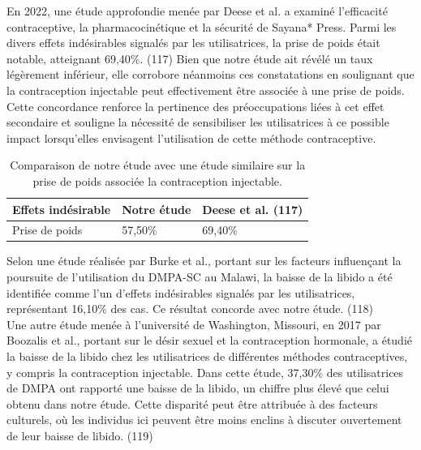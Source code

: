 \noindent En 2022, une étude approfondie menée par Deese et al. a examiné l'efficacité contraceptive, la pharmacocinétique et la sécurité de Sayana* Press. Parmi les divers effets indésirables signalés par les utilisatrices, la prise de poids était notable, atteignant 69,40\%. (117) Bien que notre étude ait révélé un taux légèrement inférieur, elle corrobore néanmoins ces constatations en soulignant que la contraception injectable peut effectivement être associée à une prise de poids. Cette concordance renforce la pertinence des préoccupations liées à cet effet secondaire et souligne la nécessité de sensibiliser les utilisatrices à ce possible impact lorsqu'elles envisagent l'utilisation de cette méthode contraceptive.

\begin{table}[H]
  \centering
  \renewcommand{\arraystretch}{1.5}

  \begin{spacing}{1.5} %
  \begin{tabularx}{\textwidth}{|X|X|X|}
      \hline
      \textbf{Effets indésirable} & \textbf{Notre étude } & \textbf{Deese et al. (117)}\\
      \hline
      Prise de poids  & 57,50\% & 69,40\%\\      
      
      \hline
  \end{tabularx}
\end{spacing}
\captionsetup{justification=centering} %
\caption{Comparaison de notre étude avec une étude similaire sur la prise de poids associée la contraception injectable.}

\end{table}

\noindent Selon une étude réalisée par Burke et al., portant sur les facteurs influençant la poursuite de l’utilisation du DMPA-SC au Malawi, la baisse de la libido a été identifiée comme l’un d’effets indésirables signalés par les utilisatrices, représentant 16,10\% des cas. Ce résultat concorde avec notre étude. (118)\\

\noindent Une autre étude menée à l'université de Washington, Missouri, en 2017 par Boozalis et al., portant sur le désir sexuel et la contraception hormonale, a étudié la baisse de la libido chez les utilisatrices de différentes méthodes contraceptives, y compris la contraception injectable. Dans cette étude, 37,30\% des utilisatrices de DMPA ont rapporté une baisse de la libido, un chiffre plus élevé que celui obtenu dans notre étude. Cette disparité peut être attribuée à des facteurs culturels, où les individus ici peuvent être moins enclins à discuter ouvertement de leur baisse de libido. (119) 

